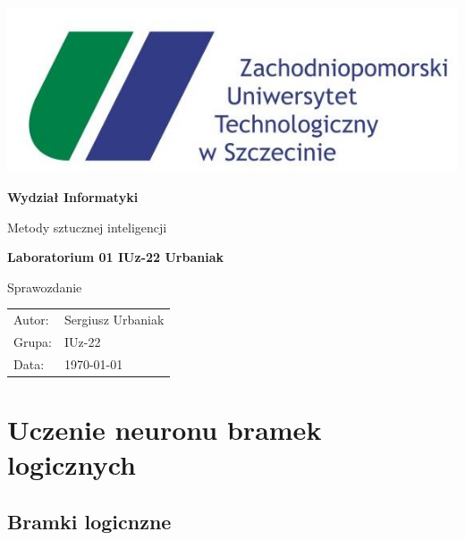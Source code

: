 \documentclass[pointlessnumbers, abstracton, headsepline, a4paper]{scrartcl}
\begin{document}
\begin{titlepage}

\begin{center}
\includegraphics[scale=0.5]{logos/zut.jpg}
\par
\end{center}

\begin{center}
\textsf{\textbf{\LARGE Wydział Informatyki}}
\end{center}{\LARGE}

\vspace{1.5cm}

\begin{center}
\textsf{\Large Metody sztucznej inteligencji}
\end{center}

\begin{center}
\textsf{\textbf{\Large Laboratorium 01 IUz-22 Urbaniak}}
\end{center}

\begin{center}
\textsf{\large Sprawozdanie}
\end{center}

\vspace{3.5cm}

\begin{center}
\begin{tabular}{ll}
Autor: & Sergiusz Urbaniak\tabularnewline
Grupa: & IUz-22\tabularnewline
Data: & \today\tabularnewline
\end{tabular}
\end{center}

\end{titlepage}

\section{Uczenie neuronu bramek logicznych}
\subsection{Bramki logicnzne}
\end{document}
